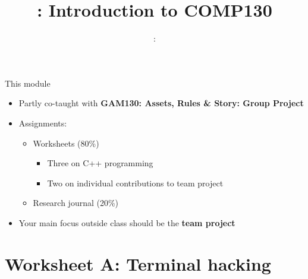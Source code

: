 \usepackage{../../beamerthemeFalmouthGamesAcademy}
\usepackage{multimedia}
\graphicspath{ {../../} }


\usepackage[normalem]{ulem}
\usepackage{wasysym}

\usepackage{pdfpages}

\usetikzlibrary{arrows,automata}




\title{\sessionnumber: Introduction to COMP130}
\subtitle{\modulecode: \moduletitle}

\frame{\titlepage} 


\begin{frame}{This module}
	\begin{itemize}
		\pause\item Partly co-taught with \textbf{GAM130: Assets, Rules \& Story: Group Project}
		\pause\item Assignments:
			\begin{itemize}
				\pause\item Worksheets (80\%)
					\begin{itemize}
						\pause\item Three on C++ programming
						\pause\item Two on individual contributions to team project
					\end{itemize}
				\pause\item Research journal (20\%)
			\end{itemize}
		\pause\item Your main focus outside class should be the \textbf{team project}
	\end{itemize}
\end{frame}



\part{Worksheet A: Terminal hacking}
\frame{\partpage}



